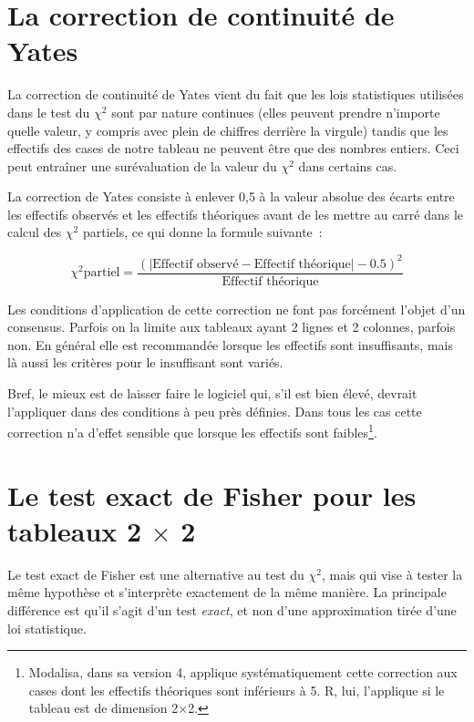 \documentclass[a4paper,10pt,twoside,francais]{report}
\newcommand{\chid}{$\chi^2$\xspace}
\begin{document}
\section{La correction de continuité de Yates}

La correction de continuité de Yates vient du fait que les lois
statistiques utilisées dans le test du \chid sont par nature continues
(elles peuvent prendre n'importe quelle valeur, y compris avec plein
de chiffres derrière la virgule) tandis que les effectifs des cases de
notre tableau ne peuvent être que des nombres entiers. Ceci peut
entraîner une surévaluation de la valeur du \chid dans certains cas.

La correction de Yates consiste à enlever 0,5 à la valeur absolue des
écarts entre les effectifs observés et les effectifs théoriques avant
de les mettre au carré dans le calcul des \chid partiels, ce qui donne
la formule suivante~:

$$\chi^2 \text{partiel} = \frac{ (| \text{Effectif observé} - \text{Effectif théorique} | - 0.5)^2}{\text{Effectif théorique}}$$


Les conditions d'application de cette correction ne font pas forcément
l'objet d'un consensus. Parfois on la limite aux tableaux ayant 2
lignes et 2 colonnes, parfois non. En général elle est recommandée
lorsque les effectifs sont insuffisants, mais là aussi les critères
pour le \og insuffisant \fg{} sont variés.

Bref, le mieux est de laisser faire le logiciel qui, s'il est bien
élevé, devrait l'appliquer dans des conditions à peu près
définies. Dans tous les cas cette correction n'a d'effet sensible que
lorsque les effectifs sont faibles\footnote{\textsf{Modalisa}, dans sa
  version 4, applique systématiquement cette correction aux cases dont
  les effectifs théoriques sont inférieurs à 5. \textsf{R}, lui,
  l'applique si le tableau est de dimension 2$\times$2.}.


\section{Le test exact de Fisher pour les tableaux  2
  \texorpdfstring{$\times$}{x} 2}
\label{ssec-testfisher}

Le test exact de Fisher est une alternative au test du \chid, mais qui
vise à tester la même hypothèse et s'interprète exactement de la même
manière. La principale différence est qu'il s'agit d'un test
\textit{exact}, et non d'une approximation tirée d'une loi
statistique.
\end{document}
